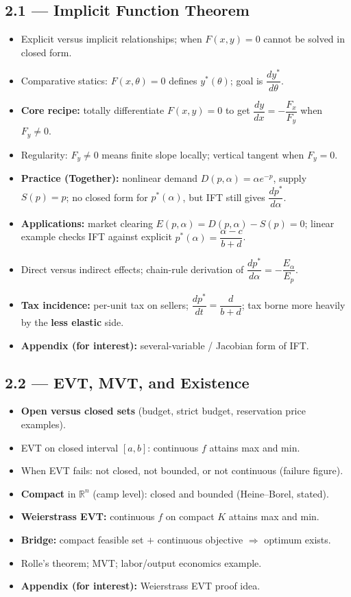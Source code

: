 \documentclass[11pt,a4paper]{article}
\begin{document}
\subsection{2.1 --- Implicit Function Theorem}
\begin{itemize}[leftmargin=*]
    \item Explicit versus implicit relationships; when $F(x,y)=0$ cannot be solved in closed form.
    \item Comparative statics: $F(x,\theta)=0$ defines $y^*(\theta)$; goal is $\dfrac{dy^*}{d\theta}$.
    \item \textbf{Core recipe:} totally differentiate $F(x,y)=0$ to get
      $\dfrac{dy}{dx}=-\dfrac{F_x}{F_y}$ when $F_y\neq 0$.
    \item Regularity: $F_y\neq 0$ means finite slope locally; vertical tangent when $F_y=0$.
    \item \textbf{Practice (Together):} nonlinear demand $D(p,\alpha)=\alpha e^{-p}$, supply $S(p)=p$;
      no closed form for $p^*(\alpha)$, but IFT still gives $\dfrac{dp^*}{d\alpha}$.
    \item \textbf{Applications:} market clearing $E(p,\alpha)=D(p,\alpha)-S(p)=0$;
      linear example checks IFT against explicit $p^*(\alpha)=\dfrac{\alpha-c}{b+d}$.
    \item Direct versus indirect effects; chain-rule derivation of $\dfrac{dp^*}{d\alpha}=-\dfrac{E_\alpha}{E_p}$.
    \item \textbf{Tax incidence:} per-unit tax on sellers; $\dfrac{dp^*}{dt}=\dfrac{d}{b+d}$;
      tax borne more heavily by the \textbf{less elastic} side.
    \item \textbf{Appendix (for interest):} several-variable / Jacobian form of IFT.
\end{itemize}

\subsection{2.2 --- EVT, MVT, and Existence}
\begin{itemize}[leftmargin=*]
    \item \textbf{Open versus closed sets} (budget, strict budget, reservation price examples).
    \item EVT on closed interval $[a,b]$: continuous $f$ attains max and min.
    \item When EVT fails: not closed, not bounded, or not continuous (failure figure).
    \item \textbf{Compact} in $\mathbb{R}^n$ (camp level): closed and bounded (Heine--Borel, stated).
    \item \textbf{Weierstrass EVT:} continuous $f$ on compact $K$ attains max and min.
    \item \textbf{Bridge:} compact feasible set $+$ continuous objective $\Rightarrow$ optimum exists.
    \item Rolle's theorem; MVT; labor/output economics example.
    \item \textbf{Appendix (for interest):} Weierstrass EVT proof idea.
\end{itemize}
\end{document}
